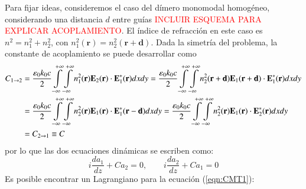 Para fijar ideas, consideremos el caso del dímero monomodal homogéneo, considerando una distancia $d$ entre guías \textcolor{red}{INCLUIR ESQUEMA PARA EXPLICAR ACOPLAMIENTO}. El índice de refracción en este caso es $n^2 = n_1^2 + n_2^2$, con $n_1^2(\textbf{r})=n_2^2(\textbf{r}+\textbf{d})$. Dada la simetría del problema, la constante de acoplamiento se puede desarrollar como 
\begin{align}
	C_{1 \to 2} &=  \frac{\epsilon_0 k_0 c}{2}\int\displaylimits_{-\infty}^{+\infty}\int\displaylimits_{-\infty}^{+\infty}  n_1^2(\textbf{r}) \textbf{E}_{2}(\textbf{r}) \cdot \textbf{E}_{1}^*(\textbf{r}) dxdy 
	=\frac{\epsilon_0 k_0 c}{2}\int\displaylimits_{-\infty}^{+\infty}\int\displaylimits_{-\infty}^{+\infty}  n_2^2(\textbf{r}+\textbf{d}) \textbf{E}_{1}(\textbf{r}+\textbf{d}) \cdot \textbf{E}_{1}^*(\textbf{r}) dxdy 
	\nonumber	
	\\	
	&= \frac{\epsilon_0 k_0 c}{2}\int\displaylimits_{-\infty}^{+\infty}\int\displaylimits_{-\infty}^{+\infty} n_2^2(\textbf{r}) \textbf{E}_{1}(\textbf{r}) \cdot \textbf{E}_{1}^*(\textbf{r}-\textbf{d}) dxdy 
	= \frac{\epsilon_0 k_0 c}{2}\int\displaylimits_{-\infty}^{+\infty}\int\displaylimits_{-\infty}^{+\infty} n_2^2(\textbf{r}) \textbf{E}_{1}(\textbf{r}) \cdot \textbf{E}_{2}^*(\textbf{r}) dxdy 
	\nonumber
	\\	
	&= C_{2\to1} \equiv C
	\nonumber
\end{align}
 por lo que las dos ecuaciones dinámicas se escriben como:
\begin{equation}
	i\frac{d a_1}{dz} + C a_2 = 0, \quad\quad i\frac{d a_2}{dz} + C a_1 = 0 \nonumber
\end{equation}
Es posible encontrar un Lagrangiano para la ecuación (\ref{eqn:CMT1}):


